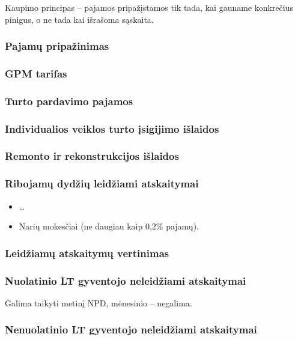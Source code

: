 Kaupimo principas – pajamos pripažįstamos tik tada, kai gauname
konkrečius pinigus, o ne tada kai išrašoma sąskaita.

\subsubsection{Pajamų pripažinimas}

\subsubsection{GPM tarifas}

\subsubsection{Turto pardavimo pajamos}

\subsubsection{Individualios veiklos turto įsigijimo išlaidos}

\subsubsection{Remonto ir rekonstrukcijos išlaidos}

\subsubsection{Ribojamų dydžių leidžiami atskaitymai}

\begin{itemize}
  \item …
  \item Narių mokesčiai (ne daugiau kaip 0,2\% pajamų).
\end{itemize}

\subsubsection{Leidžiamų atskaitymų vertinimas}

\subsubsection{Nuolatinio LT gyventojo neleidžiami atskaitymai}

Galima taikyti metinį NPD, mėnesinio – negalima.

\subsubsection{Nenuolatinio LT gyventojo neleidžiami atskaitymai}

